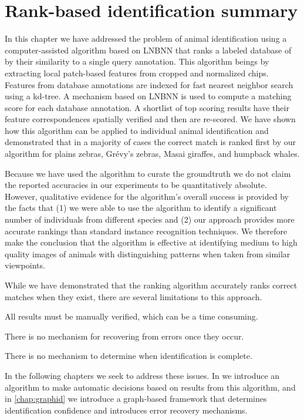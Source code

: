 \section{Rank-based identification summary}\label{sec:staticsum}

    In this chapter we have addressed the problem of animal identification using a computer-assisted algorithm
    based on LNBNN that ranks a labeled database of \names{} by their similarity to a single query annotation. This
    algorithm beings by extracting local patch-based features from cropped and normalized chips. Features from
    database annotations are indexed for fast nearest neighbor search using a kd-tree. A mechanism based on LNBNN
    is used to compute a matching score for each database annotation. A shortlist of top scoring results have their
    feature correspondences spatially verified and then are re-scored. We have shown how this algorithm can be
    applied to individual animal identification and demonstrated that in a majority of cases the correct match is
    ranked first by our algorithm for plains zebras, Grévy's zebras, Masai giraffes, and humpback whales.

    Because we have used the algorithm to curate the groundtruth we do not claim the reported accuracies in our
    experiments to be quantitatively absolute. However, qualitative evidence for the algorithm's overall success is
    provided by the facts that (1) we were able to use the algorithm to identify a significant number of
    individuals from different species and (2) our approach provides more accurate rankings than standard instance
    recognition techniques. We therefore make the conclusion that the algorithm is effective at identifying medium
    to high quality images of animals with distinguishing patterns when taken from similar viewpoints.

    While we have demonstrated that the ranking algorithm accurately ranks correct matches when they exist, there
      are several limitations to this approach.
    \begin{enumln}
        \item All results must be manually verified, which can be a time consuming.
        \item There is no mechanism for recovering from errors once they occur.
        \item There is no mechanism to determine when identification is complete.
    \end{enumln}
    In the following chapters we seek to address these issues.
    In  we introduce an algorithm to make automatic decisions based on results from this
      algorithm, and in \cref{chap:graphid} we introduce a graph-based framework that determines identification
      confidence and introduces error recovery mechanisms.



